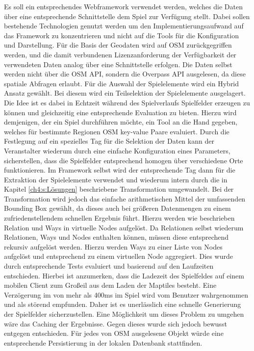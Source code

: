 Es soll ein entsprechendes Webframework verwendet werden, welches die Daten über eine entsprechende Schnittstelle dem Spiel zur Verfügung stellt. Dabei sollen bestehende Technologien genutzt werden um den Implementierungsaufwand auf das Framework zu konzentrieren und nicht auf die Tools für die Konfiguration und Darstellung.
Für die Basis der Geodaten wird auf OSM zurückgegriffen werden, und die damit verbundenen Lizenzanforderung der Verfügbarkeit der verwendeten Daten analog über eine Schnittstelle erfolgen. Die Daten selbst werden nicht über die OSM API, sondern die Overpass API ausgelesen, da diese spatiale Abfragen erlaubt.
Für die Auswahl der Spielelemente wird ein Hybrid Ansatz gewählt. Bei diesem wird ein Teilselektion der Spielelemente ausgelagert.
Die Idee ist es dabei in Echtzeit während des Spielverlaufs Spielfelder erzeugen zu können und gleichzeitig eine entsprechende Evaluation zu bieten. Hierzu wird demjenigen, der ein Spiel durchführen möchte, ein Tool an die Hand gegeben, welches für bestimmte Regionen OSM key-value Paare evaluiert. Durch die Festlegung auf ein spezielles Tag für die Selektion der Daten kann der Veranstalter wiederum durch eine einfache Konfiguration eines Parameters, sicherstellen, dass die Spielfelder entsprechend homogen über verschiedene Orte funktionieren. Im Framework selbst wird der entsprechende Tag dann für die Extraktion der Spielelemente verwendet und wiederum intern durch die in Kapitel \ref{ch4:s:Lösungen} beschriebene Transformation umgewandelt. Bei der Transformation wird jedoch das einfache arithmetischen Mittel der umfassenden Bounding Box gewählt, da dieses auch bei größeren Datenmengen zu einem zufriedenstellendem schnellen Ergebnis führt. Hierzu werden wie beschrieben Relation und Ways in virtuelle Nodes aufgelöst. Da Relationen selbst wiederum Relationen, Ways und Nodes enthalten können, müssen diese entsprechend rekursiv aufgelöst werden. Hierzu werden Ways zu einer Liste von Nodes aufgelöst und entsprechend zu einem virtuellen Node aggregiert. Dies wurde durch entsprechende Tests evaluiert und basierend auf den Laufzeiten entschieden. Hierbei ist anzumerken, dass die Ladezeit des Spielfeldes auf einem mobilen Client zum Großeil aus dem Laden der Maptiles besteht. Eine Verzögerung im von mehr als 400ms im Spiel wird vom Benutzer wahrgenommen und als störend empfunden.\cite{Gutwin.2004} Daher ist es unerlässlich eine schnelle Generierung der Spielfelder sicherzustellen. 
Eine Möglichkeit um dieses Problem zu umgehen wäre das Caching der Ergebnisse. Gegen dieses wurde sich jedoch bewusst entgegen entschieden. Für jedes von OSM ausgelesene Objekt würde eine entsprechende Persistierung in der lokalen Datenbank stattfinden.
